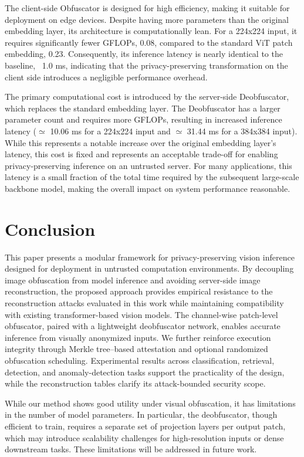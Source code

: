 \documentclass{ieeeaccess}
\newcommand{\rev}[1]{{\color{green}#1}}
\begin{document}
The client-side Obfuscator is designed for high efficiency, making it suitable for deployment on edge devices. Despite having more parameters than the original embedding layer, its architecture is computationally lean. For a 224x224 input, it requires significantly fewer GFLOPs, 0.08, compared to the standard ViT patch embedding, 0.23. Consequently, its inference latency is nearly identical to the baseline, ~1.0 ms, indicating that the privacy-preserving transformation on the client side introduces a negligible performance overhead.

The primary computational cost is introduced by the server-side Deobfuscator, which replaces the standard embedding layer. The Deobfuscator has a larger parameter count and requires more GFLOPs, resulting in increased inference latency ($\simeq$ 10.06 ms for a 224x224 input and $\simeq$ 31.44 ms for a 384x384 input). While this represents a notable increase over the original embedding layer's latency, this cost is fixed and represents an acceptable trade-off for enabling privacy-preserving inference on an untrusted server. For many applications, this latency is a small fraction of the total time required by the subsequent large-scale backbone model, making the overall impact on system performance reasonable.

\section{Conclusion} \label{sec:con}

\rev{This paper presents a modular framework for privacy-preserving vision inference designed for deployment in untrusted computation environments. By decoupling image obfuscation from model inference and avoiding server-side image reconstruction, the proposed approach provides empirical resistance to the reconstruction attacks evaluated in this work while maintaining compatibility with existing transformer-based vision models. The channel-wise patch-level obfuscator, paired with a lightweight deobfuscator network, enables accurate inference from visually anonymized inputs. We further reinforce execution integrity through Merkle tree--based attestation and optional randomized obfuscation scheduling. Experimental results across classification, retrieval, detection, and anomaly-detection tasks support the practicality of the design, while the reconstruction tables clarify its attack-bounded security scope.}

\rev{While our method shows good utility under visual obfuscation, it has limitations in the number of model parameters. In particular, the deobfuscator, though efficient to train, requires a separate set of projection layers per output patch, which may introduce scalability challenges for high-resolution inputs or dense downstream tasks. These limitations will be addressed in future work.}
\end{document}
